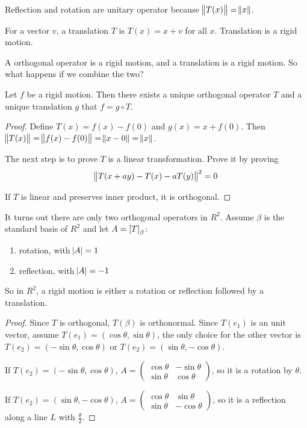 Reflection and rotation are unitary operator because $\norm{T(x)} = \norm{x}$.

\begin{definition}[Translation]
    For a vector $v$, a translation $T$ is $T(x) = x + v$ for all $x$. Translation is a rigid motion.
\end{definition}

A orthogonal operator is a rigid motion, and a translation is a rigid motion. So what happens if we combine the two?

\begin{theorem}
    Let $f$ be a rigid motion. Then there exists a unique orthogonal operator $T$ and a unique translation $g$ that $f = g  \circ T$.
\end{theorem}
\begin{proof}
    Define $T(x) = f(x) - f(0)$ and $g(x) = x + f(0)$. Then $\norm{T(x)} = \norm{f(x) - f(0)} = \norm{x - 0} = \norm{x}$.
    
    The next step is to prove $T$ is a linear transformation. Prove it by proving 
    \begin{equation*}
        \norm{T(x + a y) - T(x) - aT(y)}^2 = 0
    \end{equation*}
    
    If $T$ is linear and preserves inner product, it is orthogonal.
\end{proof}

\begin{theorem}
    It turns out there are only two orthogonal operators in $R^2$. Assume $\beta$ is the standard basis of $R^2$ and let $A = \coordinate{T}_\beta$:
\begin{enumerate}
    \item rotation, with $\abs{A} = 1$
    \item reflection, with $\abs{A} = -1$
\end{enumerate}

So in $R^2$, a rigid motion is either a rotation or reflection followed by a translation.
\end{theorem}
\begin{proof}
    Since $T$ is orthogonal, $T(\beta)$ is orthonormal. Since $T(e_1)$ is an unit vector, assume $T(e_1) = (\cos \theta, \sin \theta)$, the only choice for the other vector is $T(e_2) = (- \sin \theta, \cos \theta)$ or $T(e_2) = (\sin \theta, - \cos \theta)$.
    
    If $T(e_2) = (- \sin \theta, \cos \theta)$, $A = \begin{pmatrix}
                \cos \theta & - \sin \theta \\
        \sin \theta & \cos \theta
    \end{pmatrix}$, so it is a rotation by $\theta$.
    
    If $T(e_2) = (\sin \theta, - \cos \theta)$, $A = \begin{pmatrix}
        \cos \theta & \sin \theta \\
        \sin \theta & -\cos \theta
    \end{pmatrix}$, so it is a reflection along a line $L$ with $\displaystyle \frac{\theta}{2}$.
\end{proof}


